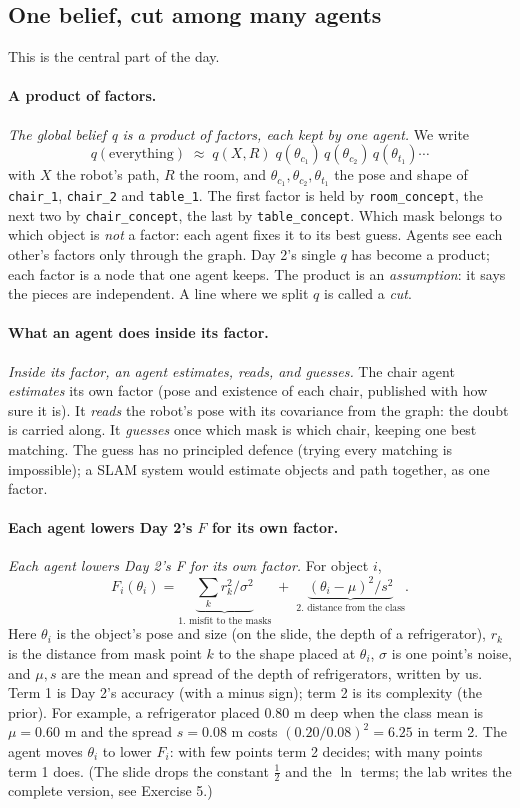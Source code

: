 \documentclass[11pt]{article}
\newcommand{\slt}[1]{\emph{#1}}   %
\begin{document}
\subsection{One belief, cut among many agents}

This is the central part of the day.

\paragraph{A product of factors.} \slt{The global belief q is a product of factors, each kept by one agent.} We write
\[
q(\text{everything}) \;\approx\; q(X,R)\;q(\theta_{c_1})\,q(\theta_{c_2})\,q(\theta_{t_1})\cdots
\]
with $X$ the robot's path, $R$ the room, and $\theta_{c_1},\theta_{c_2},\theta_{t_1}$ the pose and shape of \texttt{chair\_1}, \texttt{chair\_2} and \texttt{table\_1}. The first factor is held by \texttt{room\_concept}, the next two by \texttt{chair\_concept}, the last by \texttt{table\_concept}. Which mask belongs to which object is \emph{not} a factor: each agent fixes it to its best guess. Agents see each other's factors only through the graph. Day 2's single $q$ has become a product; each factor is a node that one agent keeps. The product is an \emph{assumption}: it says the pieces are independent. A line where we split $q$ is called a \emph{cut}.

\paragraph{What an agent does inside its factor.} \slt{Inside its factor, an agent estimates, reads, and guesses.} The chair agent \emph{estimates} its own factor (pose and existence of each chair, published with how sure it is). It \emph{reads} the robot's pose with its covariance from the graph: the doubt is carried along. It \emph{guesses} once which mask is which chair, keeping one best matching. The guess has no principled defence (trying every matching is impossible); a SLAM system would estimate objects and path together, as one factor.

\paragraph{Each agent lowers Day 2's $F$ for its own factor.} \slt{Each agent lowers Day 2's F for its own factor.} For object $i$,
\[
F_i(\theta_i)=\underbrace{\sum_k r_k^2/\sigma^2}_{\text{1. misfit to the masks}}\;+\;\underbrace{(\theta_i-\mu)^2/s^2}_{\text{2. distance from the class}} .
\]
Here $\theta_i$ is the object's pose and size (on the slide, the depth of a refrigerator), $r_k$ is the distance from mask point $k$ to the shape placed at $\theta_i$, $\sigma$ is one point's noise, and $\mu,s$ are the mean and spread of the depth of refrigerators, written by us. Term 1 is Day 2's accuracy (with a minus sign); term 2 is its complexity (the prior). For example, a refrigerator placed 0.80 m deep when the class mean is $\mu=0.60$ m and the spread $s=0.08$ m costs $(0.20/0.08)^2 = 6.25$ in term 2. The agent moves $\theta_i$ to lower $F_i$: with few points term 2 decides; with many points term 1 does. (The slide drops the constant $\tfrac12$ and the $\ln$ terms; the lab writes the complete version, see Exercise 5.)
\end{document}
